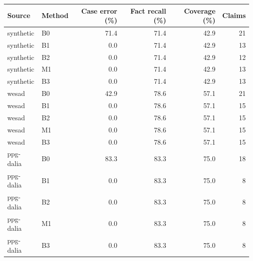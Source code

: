\begin{tabular}{llrrrr}
\toprule
Source & Method & Case error (\%) & Fact recall (\%) & Coverage (\%) & Claims \\
\midrule
synthetic & B0 & 71.4 & 71.4 & 42.9 & 21 \\
synthetic & B1 & 0.0 & 71.4 & 42.9 & 13 \\
synthetic & B2 & 0.0 & 71.4 & 42.9 & 12 \\
synthetic & M1 & 0.0 & 71.4 & 42.9 & 13 \\
synthetic & B3 & 0.0 & 71.4 & 42.9 & 13 \\
wesad & B0 & 42.9 & 78.6 & 57.1 & 21 \\
wesad & B1 & 0.0 & 78.6 & 57.1 & 15 \\
wesad & B2 & 0.0 & 78.6 & 57.1 & 15 \\
wesad & M1 & 0.0 & 78.6 & 57.1 & 15 \\
wesad & B3 & 0.0 & 78.6 & 57.1 & 15 \\
ppg-dalia & B0 & 83.3 & 83.3 & 75.0 & 18 \\
ppg-dalia & B1 & 0.0 & 83.3 & 75.0 & 8 \\
ppg-dalia & B2 & 0.0 & 83.3 & 75.0 & 8 \\
ppg-dalia & M1 & 0.0 & 83.3 & 75.0 & 8 \\
ppg-dalia & B3 & 0.0 & 83.3 & 75.0 & 8 \\
\bottomrule
\end{tabular}
